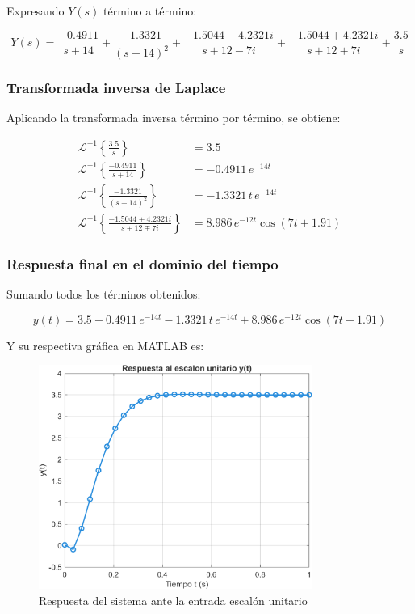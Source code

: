 \documentclass[11pt,letterpaper]{article}
\begin{document}
Expresando \( Y(s) \) término a término:

\begin{equation}
Y(s) =
\frac{-0.4911}{s + 14} +
\frac{-1.3321}{(s + 14)^2} +
\frac{-1.5044 - 4.2321i}{s + 12 - 7i} +
\frac{-1.5044 + 4.2321i}{s + 12 + 7i} +
\frac{3.5}{s}
\end{equation}

\subsubsection{Transformada inversa de Laplace}

Aplicando la transformada inversa término por término, se obtiene:

\begin{align}
\mathcal{L}^{-1} \left\{ \frac{3.5}{s} \right\} &= 3.5 \\
\mathcal{L}^{-1} \left\{ \frac{-0.4911}{s + 14} \right\} &= -0.4911\, e^{-14t} \\
\mathcal{L}^{-1} \left\{ \frac{-1.3321}{(s + 14)^2} \right\} &= -1.3321\, t\, e^{-14t} \\
\mathcal{L}^{-1} \left\{ \frac{-1.5044 \pm 4.2321i}{s + 12 \mp 7i} \right\} &= 8.986\, e^{-12t} \cos(7t + 1.91)
\end{align}

\subsubsection{Respuesta final en el dominio del tiempo}

Sumando todos los términos obtenidos:

\begin{equation}
y(t) = 3.5
- 0.4911\, e^{-14t}
- 1.3321\, t\, e^{-14t}
+ 8.986\, e^{-12t} \cos(7t + 1.91)
\end{equation}

Y su respectiva gráfica en MATLAB es:
\begin{figure}[H]
\centering
\includegraphics[width=0.8\textwidth]{./img/2-a-2.png}
\caption{Respuesta del sistema ante la entrada escalón unitario}
\label{fig:respuesta}
\end{figure}
\end{document}
